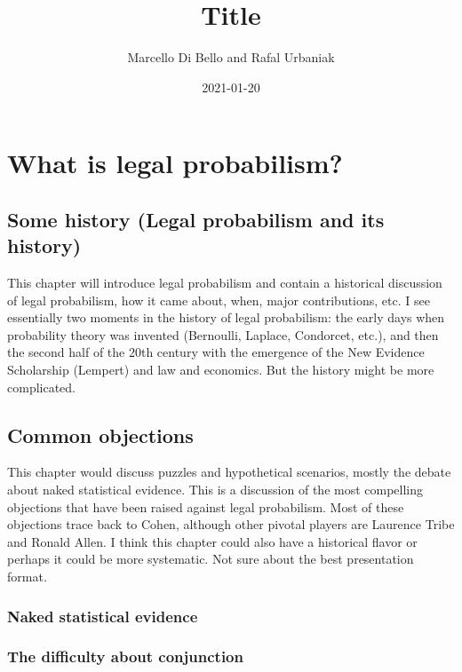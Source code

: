 \documentclass[]{book}
\title{Title}
\author{Marcello Di Bello and Rafal Urbaniak}
\date{2021-01-20}
\begin{document}
\maketitle

{
\setcounter{tocdepth}{1}
\tableofcontents
}
\part{What is legal probabilism?}

\chapter{Some history (Legal probabilism and its history)}

This chapter will introduce legal probabilism and contain a historical
discussion of legal probabilism, how it came about, when, major
contributions, etc. I see essentially two moments in the history of
legal probabilism: the early days when probability theory was invented
(Bernoulli, Laplace, Condorcet, etc.), and then the second half of the
20th century with the emergence of the New Evidence Scholarship
(Lempert) and law and economics. But the history might be more
complicated.

\chapter{Common objections}


This chapter would discuss puzzles and hypothetical scenarios, mostly
the debate about naked statistical evidence. This is a discussion of the
most compelling objections that have been raised against legal
probabilism. Most of these objections trace back to Cohen, although
other pivotal players are Laurence Tribe and Ronald Allen. I think this
chapter could also have a historical flavor or perhaps it could be more
systematic. Not sure about the best presentation format.

\section{Naked statistical evidence}\label{sec:naked}

\section{The difficulty about conjunction}
\end{document}
